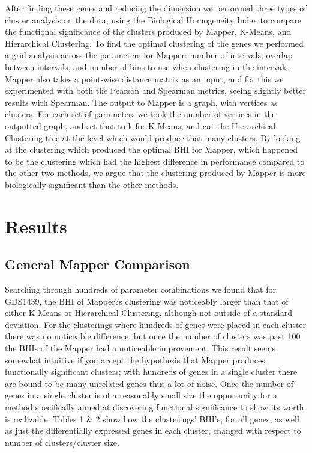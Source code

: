 \documentclass[preprint,10pt]{elsarticle}
\begin{document}
	After finding these genes and reducing the dimension we performed three types of cluster analysis on the data, using the Biological Homogeneity Index to compare the functional significance of the clusters produced by Mapper, K-Means, and Hierarchical Clustering. To find the optimal clustering of the genes we performed a grid analysis across the parameters for Mapper: number of intervals, overlap between intervals, and number of bins to use when clustering in the intervals. Mapper also takes a point-wise distance matrix as an input, and for this we experimented with both the Pearson and Spearman metrics, seeing slightly better results with Spearman. The output to Mapper is a graph, with vertices as clusters. For each set of parameters we took the number of vertices in the outputted graph, and set that to k for K-Means, and cut the Hierarchical Clustering tree at the level which would produce that many clusters. By looking at the clustering which produced the optimal BHI for Mapper, which happened to be the clustering which had the highest difference in performance compared to the other two methods, we argue that the clustering produced by Mapper is more biologically significant than the other methods.


\section{Results}


\subsection{General Mapper Comparison}
	Searching through hundreds of parameter combinations we found that for GDS1439, the BHI of Mapper?s clustering was noticeably larger than that of either K-Means or Hierarchical Clustering, although not outside of a standard deviation. For the clusterings where hundreds of genes were placed in each cluster there was no noticeable difference, but once the number of clusters was past 100 the BHIs of the Mapper had a noticeable improvement. This result seems somewhat intuitive if you accept the hypothesis that Mapper produces functionally significant clusters; with hundreds of genes in a single cluster there are bound to be many unrelated genes thus a lot of noise. Once the number of genes in a single cluster is of a reasonably small size the opportunity for a method specifically aimed at discovering functional significance to show its worth is realizable. Tables 1 \& 2 show how the clusterings' BHI's, for all genes, as well as just the differentially expressed genes in each cluster, changed with respect to number of clusters/cluster size.
	
\end{document}
